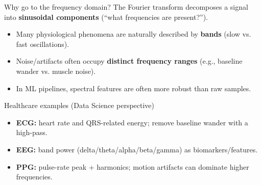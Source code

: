 \documentclass[aspectratio=169]{beamer}
\begin{document}
\begin{frame}{Why go to the frequency domain?}
\small
The Fourier transform decomposes a signal into \textbf{sinusoidal components} (``what frequencies are present?'').

\begin{itemize}
  \item Many physiological phenomena are naturally described by \textbf{bands} (slow vs. fast oscillations).
  \item Noise/artifacts often occupy \textbf{distinct frequency ranges} (e.g., baseline wander vs. muscle noise).
  \item In ML pipelines, spectral features are often more robust than raw samples.
\end{itemize}

\begin{block}{Healthcare examples (Data Science perspective)}
\begin{itemize}
  \item \textbf{ECG:} heart rate and QRS-related energy; remove baseline wander with a high-pass.
  \item \textbf{EEG:} band power (delta/theta/alpha/beta/gamma) as biomarkers/features.
  \item \textbf{PPG:} pulse-rate peak + harmonics; motion artifacts can dominate higher frequencies.
\end{itemize}
\end{block}
\end{frame}
\end{document}
